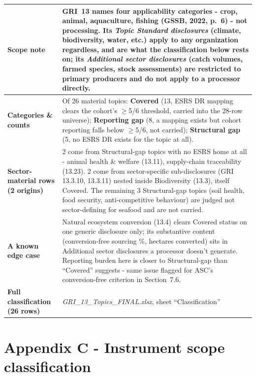 \documentclass[
]{article}
\begin{document}
\begin{tabularx}{\textwidth}{@{} >{\bfseries}p{3.4cm} X @{}}
\toprule
Scope note & GRI~13 names four applicability categories - crop, animal, aquaculture, fishing (GSSB, 2022, p.~6) - not processing. Its \emph{Topic Standard disclosures} (climate, biodiversity, water, etc.) apply to any organization regardless, and are what the classification below rests on; its \emph{Additional sector disclosures} (catch volumes, farmed species, stock assessments) are restricted to primary producers and do not apply to a processor directly. \\
\midrule
Categories \& counts & Of 26 material topics: \textbf{Covered} (13, ESRS DR mapping clears the cohort's $\geq$5/6 threshold, carried into the 28-row universe); \textbf{Reporting gap} (8, a mapping exists but cohort reporting falls below $\geq$5/6, not carried); \textbf{Structural gap} (5, no ESRS DR exists for the topic at all). \\
\midrule
Sector-material rows (2 origins) & 2 come from Structural-gap topics with no ESRS home at all - animal health \& welfare (13.11), supply-chain traceability (13.23). 2 come from sector-specific sub-disclosures (GRI 13.3.10, 13.3.11) nested inside Biodiversity (13.3), itself Covered. The remaining 3 Structural-gap topics (soil health, food security, anti-competitive behaviour) are judged not sector-defining for seafood and are not carried. \\
\midrule
A known edge case & Natural ecosystem conversion (13.4) clears Covered status on one generic disclosure only; its substantive content (conversion-free sourcing \%, hectares converted) sits in Additional sector disclosures a processor doesn't generate. Reporting burden here is closer to Structural-gap than ``Covered'' suggests - same issue flagged for ASC's conversion-free criterion in Section~7.6. \\
\midrule
Full classification (26 rows) & \emph{GRI\_13\_Topics\_FINAL.xlsx}, sheet ``Classification'' \\
\bottomrule
\end{tabularx}

\section*{Appendix C - Instrument scope classification}\label{app:scope}
\end{document}
